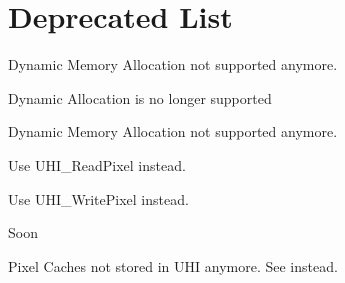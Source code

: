 \chapter{Deprecated List}
\hypertarget{deprecated}{}\label{deprecated}

\begin{DoxyRefList}
\item[Global \doxylink{linear__algebra_8h_a9feddc49bf0fbb6efcbd15f5ac2adcfb}{Delete\+Vector} (data\+\_\+t \texorpdfstring{$\ast$}{*}v)]\label{deprecated__deprecated000006}%
%
Dynamic Memory Allocation not supported anymore.  
\item[Global \doxylink{hash__table_8h_ac8f1faa6debf15cdd31b24336055ad07}{Hash\+\_\+\+Delete\+Hash\+Table} (\doxylink{struct_hash_table}{Hash\+Table} \texorpdfstring{$\ast$}{*}hash)]\label{deprecated__deprecated000001}%
%
Dynamic Allocation is no longer supported  
\item[Global \doxylink{linear__algebra_8h_ad945abceb6b4b4958eec7953858db9f2}{Init\+Vector} (int32\+\_\+t \texorpdfstring{$\ast$}{*}\texorpdfstring{$\ast$}{*}v, UINT len)]\label{deprecated__deprecated000005}%
%
Dynamic Memory Allocation not supported anymore.  
\item[Global \doxylink{uhi__io_8h_aad573fb88befb1cd5c553c20a32027a9}{Proxy\+\_\+\+Get\+Pixel} (u\+IMG \texorpdfstring{$\ast$}{*}h\+IMG, INDEX x, INDEX y, INDEX z)]\label{deprecated__deprecated000003}%
%
Use UHI\+\_\+\+Read\+Pixel instead.  
\item[Global \doxylink{uhi__io_8h_a1ec6bacb78062b9b8dde4cf3e3eeb923}{Proxy\+\_\+\+Set\+Pixel} (u\+IMG \texorpdfstring{$\ast$}{*}h\+IMG, INDEX x, INDEX y, INDEX z, PIXEL value)]\label{deprecated__deprecated000004}%
%
Use UHI\+\_\+\+Write\+Pixel instead.  
\item[Global \doxylink{local__differences_8h_a2fee6f8dd7f3cd3ed1ae75161294c4c4}{Ps} (z)]\label{deprecated__deprecated000007}%
%
Soon  
\item[Global \doxylink{uhi__io_8h_a6aba86f49a9e77ca452352dd1ef8d4af}{UHI\+\_\+\+CACHE\+\_\+\+LENGTH} ]\label{deprecated__deprecated000002}%
%
Pixel Caches not stored in UHI anymore. See  instead. 
\end{DoxyRefList}